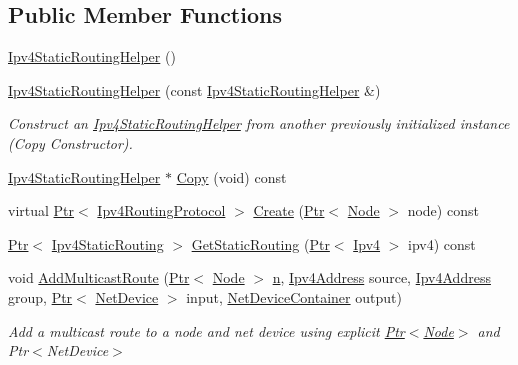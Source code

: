 \subsection*{Public Member Functions}
\begin{DoxyCompactItemize}
\item 
\hyperlink{classns3_1_1Ipv4StaticRoutingHelper_a8dac1b77f202bd0a3de3b442dfdf34dd}{Ipv4\+Static\+Routing\+Helper} ()
\item 
\hyperlink{classns3_1_1Ipv4StaticRoutingHelper_a5dab2c4bc67a155ebaf0042496209ab1}{Ipv4\+Static\+Routing\+Helper} (const \hyperlink{classns3_1_1Ipv4StaticRoutingHelper}{Ipv4\+Static\+Routing\+Helper} \&)
\begin{DoxyCompactList}\small\item\em Construct an \hyperlink{classns3_1_1Ipv4StaticRoutingHelper}{Ipv4\+Static\+Routing\+Helper} from another previously initialized instance (Copy Constructor). \end{DoxyCompactList}\item 
\hyperlink{classns3_1_1Ipv4StaticRoutingHelper}{Ipv4\+Static\+Routing\+Helper} $\ast$ \hyperlink{classns3_1_1Ipv4StaticRoutingHelper_a0cf5ca3ae4ffbfab2ed392e47327ee43}{Copy} (void) const 
\item 
virtual \hyperlink{classns3_1_1Ptr}{Ptr}$<$ \hyperlink{classns3_1_1Ipv4RoutingProtocol}{Ipv4\+Routing\+Protocol} $>$ \hyperlink{classns3_1_1Ipv4StaticRoutingHelper_afb0392b022183275e7949eb9235334e9}{Create} (\hyperlink{classns3_1_1Ptr}{Ptr}$<$ \hyperlink{classns3_1_1Node}{Node} $>$ node) const 
\item 
\hyperlink{classns3_1_1Ptr}{Ptr}$<$ \hyperlink{classns3_1_1Ipv4StaticRouting}{Ipv4\+Static\+Routing} $>$ \hyperlink{classns3_1_1Ipv4StaticRoutingHelper_a731206e50d305695dac7fb2ef963a4bb}{Get\+Static\+Routing} (\hyperlink{classns3_1_1Ptr}{Ptr}$<$ \hyperlink{classns3_1_1Ipv4}{Ipv4} $>$ ipv4) const 
\item 
void \hyperlink{classns3_1_1Ipv4StaticRoutingHelper_aa8d55f28361e24aefb961fe2eddc2192}{Add\+Multicast\+Route} (\hyperlink{classns3_1_1Ptr}{Ptr}$<$ \hyperlink{classns3_1_1Node}{Node} $>$ \hyperlink{lte__link__budget__x2__handover__measures_8m_abdb05bc5a064cf642a06c83b3392f148}{n}, \hyperlink{classns3_1_1Ipv4Address}{Ipv4\+Address} source, \hyperlink{classns3_1_1Ipv4Address}{Ipv4\+Address} group, \hyperlink{classns3_1_1Ptr}{Ptr}$<$ \hyperlink{classns3_1_1NetDevice}{Net\+Device} $>$ input, \hyperlink{classns3_1_1NetDeviceContainer}{Net\+Device\+Container} output)
\begin{DoxyCompactList}\small\item\em Add a multicast route to a node and net device using explicit \hyperlink{classns3_1_1Ptr}{Ptr$<$\+Node$>$} and Ptr$<$\+Net\+Device$>$ \end{DoxyCompactList}\item 

\end{DoxyCompactItemize}
